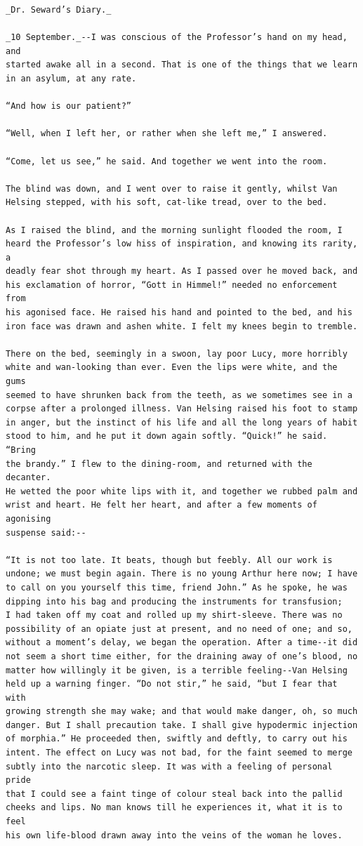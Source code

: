 \documentclass{article}
\begin{document}
\begin{verbatim}
_Dr. Seward’s Diary._

_10 September._--I was conscious of the Professor’s hand on my head, and
started awake all in a second. That is one of the things that we learn
in an asylum, at any rate.

“And how is our patient?”

“Well, when I left her, or rather when she left me,” I answered.

“Come, let us see,” he said. And together we went into the room.

The blind was down, and I went over to raise it gently, whilst Van
Helsing stepped, with his soft, cat-like tread, over to the bed.

As I raised the blind, and the morning sunlight flooded the room, I
heard the Professor’s low hiss of inspiration, and knowing its rarity, a
deadly fear shot through my heart. As I passed over he moved back, and
his exclamation of horror, “Gott in Himmel!” needed no enforcement from
his agonised face. He raised his hand and pointed to the bed, and his
iron face was drawn and ashen white. I felt my knees begin to tremble.

There on the bed, seemingly in a swoon, lay poor Lucy, more horribly
white and wan-looking than ever. Even the lips were white, and the gums
seemed to have shrunken back from the teeth, as we sometimes see in a
corpse after a prolonged illness. Van Helsing raised his foot to stamp
in anger, but the instinct of his life and all the long years of habit
stood to him, and he put it down again softly. “Quick!” he said. “Bring
the brandy.” I flew to the dining-room, and returned with the decanter.
He wetted the poor white lips with it, and together we rubbed palm and
wrist and heart. He felt her heart, and after a few moments of agonising
suspense said:--

“It is not too late. It beats, though but feebly. All our work is
undone; we must begin again. There is no young Arthur here now; I have
to call on you yourself this time, friend John.” As he spoke, he was
dipping into his bag and producing the instruments for transfusion;
I had taken off my coat and rolled up my shirt-sleeve. There was no
possibility of an opiate just at present, and no need of one; and so,
without a moment’s delay, we began the operation. After a time--it did
not seem a short time either, for the draining away of one’s blood, no
matter how willingly it be given, is a terrible feeling--Van Helsing
held up a warning finger. “Do not stir,” he said, “but I fear that with
growing strength she may wake; and that would make danger, oh, so much
danger. But I shall precaution take. I shall give hypodermic injection
of morphia.” He proceeded then, swiftly and deftly, to carry out his
intent. The effect on Lucy was not bad, for the faint seemed to merge
subtly into the narcotic sleep. It was with a feeling of personal pride
that I could see a faint tinge of colour steal back into the pallid
cheeks and lips. No man knows till he experiences it, what it is to feel
his own life-blood drawn away into the veins of the woman he loves.


\end{verbatim}
\end{document}
